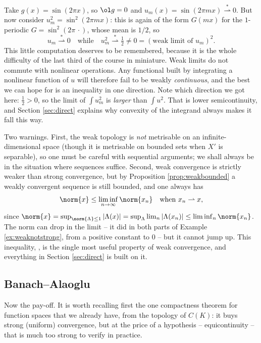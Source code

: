 \documentclass[a4paper]{scrartcl}
\newcommand{\weakto}{\rightharpoonup}
\newcommand{\wsto}{\overset{*}{\rightharpoonup}}
\begin{document}
\begin{example}\label{ex:squarestrick}
	Take $g(x)=\sin(2\pi x)$, so $\ol g = 0$ and $u_m(x) = \sin(2\pi mx)\wsto 0$. But now consider $u_m^2 = \sin^2(2\pi m x)$: this is again of the form $G(mx)$ for the $1$-periodic $G = \sin^2(2\pi\, \cdot)$, whose mean is $1/2$, so
	$$u_m \wsto 0 \quad \text{while} \quad u_m^2 \wsto \tfrac12 \ne 0 = \left( \text{weak limit of } u_m\right)^2.$$
	This little computation deserves to be remembered, because it is the whole difficulty of the last third of the course in miniature. Weak limits do not commute with nonlinear operations. Any functional built by integrating a nonlinear function of $u$ will therefore fail to be weakly \emph{continuous}, and the best we can hope for is an inequality in one direction. Note which direction we got here: $\frac 12 > 0$, so the limit of $\int u_m^2$ is \emph{larger} than $\int u^2$. That is lower semicontinuity, and Section \ref{sec:direct} explains why convexity of the integrand always makes it fall this way.
\end{example}

\begin{remark}
	Two warnings. First, the weak topology is \emph{not} metrisable on an infinite-dimensional space (though it is metrisable on bounded sets when $X'$ is separable), so one must be careful with sequential arguments; we shall always be in the situation where sequences suffice. Second, weak convergence is strictly weaker than strong convergence, but by Proposition \ref{prop:weakbounded} a weakly convergent sequence is still bounded, and one always has
	$$\norm{x} \le \liminf_{n\to\infty}\norm{x_n} \quad \text{when } x_n \weakto x,$$
	since $\norm{x} = \sup_{\norm{\Lambda}\le 1}|\Lambda(x)| = \sup_\Lambda \lim_n |\Lambda(x_n)| \le \liminf_n \norm{x_n}$. The norm can drop in the limit -- it did in both parts of Example \ref{ex:weaknotstrong}, from a positive constant to $0$ -- but it cannot jump up. This inequality, , is the single most useful property of weak convergence, and everything in Section \ref{sec:direct} is built on it.
\end{remark}

\subsection{Banach--Alaoglu}

Now the pay-off. It is worth recalling first the one compactness theorem for function spaces that we already have, from the topology of $C(K)$: it buys strong (uniform) convergence, but at the price of a hypothesis -- equicontinuity -- that is much too strong to verify in practice.
\end{document}
